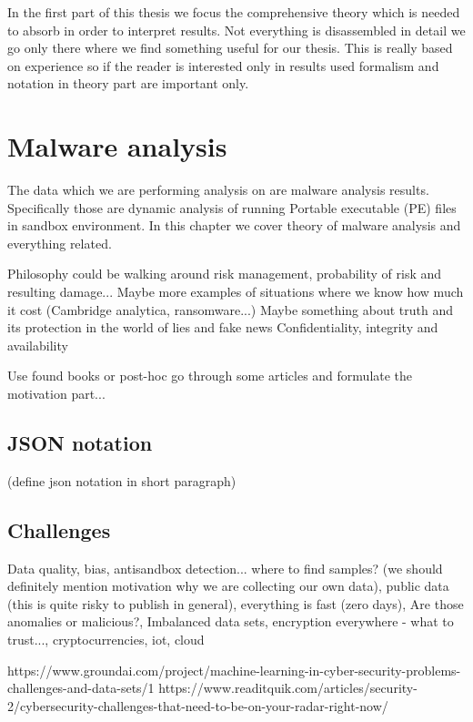In the first part of this thesis we focus the comprehensive theory which is needed to absorb in order to interpret results. Not everything is disassembled in detail we go only there where we find something useful for our thesis. This is really based on experience so if the reader is interested only in results used formalism and notation in theory part are important only.

\chapter{Malware analysis} \label{chap:analysis}
The data which we are performing analysis on are malware analysis results. Specifically those are dynamic analysis of running Portable executable (PE) files in sandbox environment. In this chapter we cover theory of malware analysis and everything related. 

Philosophy could be walking around risk management, probability of risk and resulting damage... Maybe more examples of situations where we know how much it cost (Cambridge analytica, ransomware...)
Maybe something about truth and its protection in the world of lies and fake news
Confidentiality, integrity and availability

Use found books or post-hoc go through some articles and formulate the motivation part...

\section{JSON notation} \label{sec:json_notation}
(define json notation in short paragraph)

\section{Challenges}
Data quality, bias, antisandbox detection... where to find samples? (we should definitely mention motivation why we are collecting our own data), public data (this is quite risky to publish in general), everything is fast (zero days), Are those anomalies or malicious?, Imbalanced data sets, encryption everywhere - what to trust..., cryptocurrencies, iot, cloud

https://www.groundai.com/project/machine-learning-in-cyber-security-problems-challenges-and-data-sets/1
https://www.readitquik.com/articles/security-2/cybersecurity-challenges-that-need-to-be-on-your-radar-right-now/


